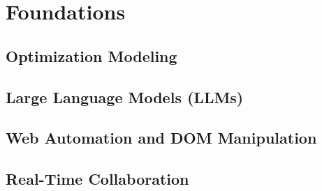 \chapter{Foundations}
\section{Optimization Modeling}
\section{Large Language Models (LLMs)}
\section{Web Automation and DOM Manipulation}
\section{Real-Time Collaboration}